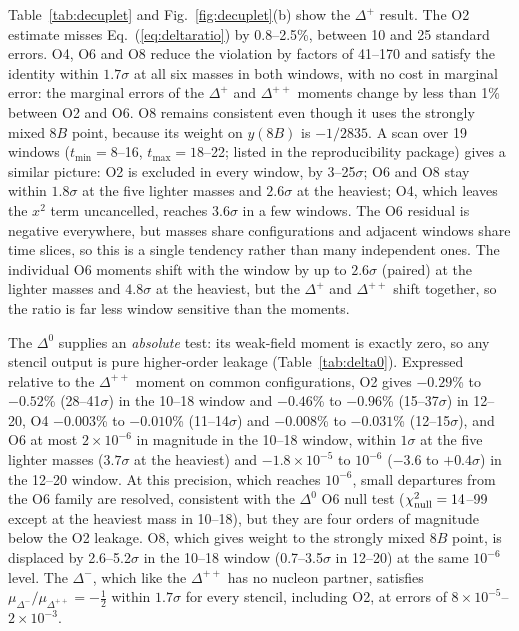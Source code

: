 \documentclass[aps,prd,reprint,twocolumn,superscriptaddress,nofootinbib,longbibliography]{revtex4-2}
\begin{document}
Table~\ref{tab:decuplet} and Fig.~\ref{fig:decuplet}(b) show the $\Delta^+$ result. The O2 estimate misses Eq.~(\ref{eq:deltaratio}) by 0.8--2.5\%, between 10 and 25 standard errors. O4, O6 and O8 reduce the violation by factors of 41--170 and satisfy the identity within $1.7\sigma$ at all six masses in both windows, with no cost in marginal error: the marginal errors of the $\Delta^+$ and $\Delta^{++}$ moments change by less than 1\% between O2 and O6. O8 remains consistent even though it uses the strongly mixed $8B$ point, because its weight on $y(8B)$ is $-1/2835$. A scan over 19 windows ($t_{\min}=8$--16, $t_{\max}=18$--22; listed in the reproducibility package) gives a similar picture: O2 is excluded in every window, by 3--25$\sigma$; O6 and O8 stay within $1.8\sigma$ at the five lighter masses and $2.6\sigma$ at the heaviest; O4, which leaves the $x^2$ term uncancelled, reaches $3.6\sigma$ in a few windows. The O6 residual is negative everywhere, but masses share configurations and adjacent windows share time slices, so this is a single tendency rather than many independent ones. The individual O6 moments shift with the window by up to $2.6\sigma$ (paired) at the lighter masses and $4.8\sigma$ at the heaviest, but the $\Delta^+$ and $\Delta^{++}$ shift together, so the ratio is far less window sensitive than the moments.

The $\Delta^0$ supplies an \emph{absolute} test: its weak-field moment is exactly zero, so any stencil output is pure higher-order leakage (Table~\ref{tab:delta0}). Expressed relative to the $\Delta^{++}$ moment on common configurations, O2 gives $-0.29$\% to $-0.52$\% (28--41$\sigma$) in the 10--18 window and $-0.46$\% to $-0.96$\% (15--37$\sigma$) in 12--20, O4 $-0.003$\% to $-0.010$\% (11--14$\sigma$) and $-0.008$\% to $-0.031$\% (12--15$\sigma$), and O6 at most $2\times10^{-6}$ in magnitude in the 10--18 window, within $1\sigma$ at the five lighter masses ($3.7\sigma$ at the heaviest) and $-1.8\times10^{-5}$ to $10^{-6}$ ($-3.6$ to $+0.4\sigma$) in the 12--20 window. At this precision, which reaches $10^{-6}$, small departures from the O6 family are resolved, consistent with the $\Delta^0$ O6 null test ($\chi^2_{\rm null}=14$--99 except at the heaviest mass in 10--18), but they are four orders of magnitude below the O2 leakage. O8, which gives weight to the strongly mixed $8B$ point, is displaced by 2.6--5.2$\sigma$ in the 10--18 window (0.7--3.5$\sigma$ in 12--20) at the same $10^{-6}$ level. The $\Delta^-$, which like the $\Delta^{++}$ has no nucleon partner, satisfies $\mu_{\Delta^-}/\mu_{\Delta^{++}}=-\tfrac12$ within $1.7\sigma$ for every stencil, including O2, at errors of $8\times10^{-5}$--$2\times10^{-3}$.
\end{document}
